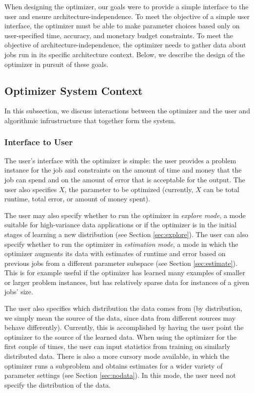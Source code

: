 
When designing the optimizer, our goals were to provide a simple 
interface to the user and ensure architecture-independence. To meet the
objective of a simple user interface, the optimizer must be able to
make parameter choices based only on user-specified time, accuracy, and
monetary budget constraints. To meet
the objective of architecture-independence, the optimizer needs to gather
data about jobs run in its specific architecture context. Below,
we describe the design of the optimizer in pursuit of these goals. 


\subsection{Optimizer System Context}

In this subsection, we discuss interactions between the optimizer and 
the user and algorithmic infrustructure that together form the system. 

\subsubsection{Interface to User}
The user's interface with the optimizer is simple: the user
provides a problem instance for the job and constraints on the amount of
time and money that the job can spend and on the amount of error
that is acceptable for the output. The user also specifies $X$, the 
parameter to be optimized (currently, $X$ can be total runtime, total
error, or amount of money spent).

The user may also specify whether to run the optimizer in {\em explore 
mode}, a mode suitable for high-variance data applications or if the 
optimizer is in the initial stages of learning a new 
distribution (see Section \ref{sec:explore}). The user can also specify
whether to run the optimizer in {\em estimation mode}, a mode in which
the optimizer augments its data with estimates of runtime and error 
based on previous jobs from a different parameter 
subspace (see Section \ref{sec:estimate}). This is for example useful 
if the optimizer has learned many examples of
smaller or larger problem instances, but has relatively sparse data
for instances of a given jobs' size. 

The user also specifies which distribution the data comes from (by
distribution, we simply mean the source of the data, since data from
different sources may behave differently). Currently,
this is accomplished by having the user point the optimizer to the 
source of the learned data. When using the optimizer for the first 
couple of times, the user can input statistics from training on similarly
distributed data. There is also a more cursory mode available, in which
the optimizer runs a subproblem and obtains estimates for a wider 
variety of parameter settings (see Section \ref{sec:nodata}). In this 
mode, the user need not specify the distribution of the data. 


